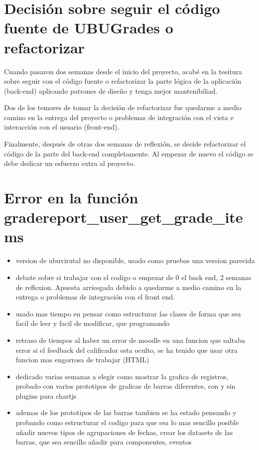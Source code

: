\section{Decisión sobre seguir el código fuente de UBUGrades o refactorizar}

Cuando pasaron dos semanas desde el inicio del proyecto, acabé en la tesitura sobre seguir con el código fuente o refactorizar la parte lógica de la aplicación (back-end) aplicando patrones de diseño y tenga mejor mantenibiliad. 

Dos de los temores de tomar la decisión de refactorizar fue quedarme a medio camino en la entrega del proyecto o problemas de integración con el vista e interacción con el usuario (front-end).

Finalmente, después de otras dos semanas de reflexión, se decide refactorizar el código de la parte del back-end completamente. Al empezar de nuevo el código se debe dedicar un esfuerzo extra al proyecto.

\section{Error en la función gradereport\_user\_get\_grade\_items}



\begin{itemize}
	\item version de ubuvirutal no disponible, usado como pruebas una version parecida
	\item debate sobre si trabajar con el codigo o empezar de 0 el back end, 2 semanas de reflexion. Apuesta arriesgada debido a quedarme a medio camino en la entrega o problemas de integración con el front end.
	\item usado mas tiempo en pensar como estructurar las clases de forma que sea facil de leer y facil de modificar, que programando
	\item retraso de tiempos al haber un error de moodle en una funcion que saltaba error si el feedback del calificador esta oculto, se ha tenido que usar otra funcion mas engorrosa de trabajar (HTML)
	\item dedicado varias semanas a elegir como mostrar la grafica de registros, probado con varios prototipos de graficas de barras diferentes, con y sin plugins para chartjs
	\item ademas de los prototipos de las barras tambien se ha estado pensando y probando como estructurar el codigo para que sea lo mas sencillo posible añadir nuevos tipos de agrupaciones de fechas, crear los datasets de las barras, que sea sencillo añadir para componentes, eventos
\end{itemize}

